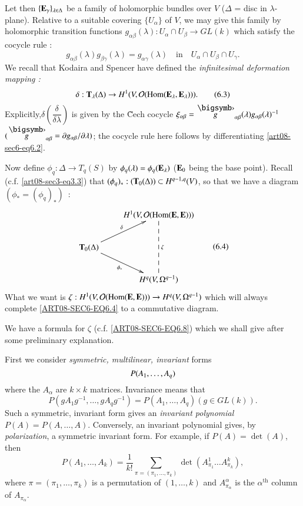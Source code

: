 Let then $\{\mathbf{E}_{\gamma}\}_{\lambda\in\Delta}$ be a family of holomorphic bundles over $V$ ($\Delta$ = disc in $\lambda$-plane). Relative to a suitable covering $\{U_{\alpha}\}$ of $V$, we may give this family by holomorphic transition functions $g_{\alpha\beta}(\lambda):U_{\alpha}\cap U_{\beta}\to GL(k)$ which satisfy the cocycle rule :
\begin{equation*}
g_{\alpha\beta}(\lambda)g_{\beta\gamma}(\lambda)=g_{\alpha\gamma}(\lambda)\text{~~ in~~ } U_{\alpha}\cap U_{\beta}\cap U_{\gamma}.\tag{6.2}\label{art08-sec6-eq6.2}
\end{equation*}
We recall that Kodaira and Spencer \cite{art08-key15} have defined the {\em infinitesimal deformation mapping :}
\begin{equation*}
\delta : \mathbf{T}_{\lambda}(\Delta)\to H^{1}(V,\mathcal{O}(\operatorname{\mathrm{Hom}}(\mathbf{E}_{\lambda},\mathbf{E}_{\lambda}))).\tag{6.3}\label{art08-sec6-eq6.3}
\end{equation*}
Explicitly,\pageoriginale $\delta\left(\dfrac{\delta}{\delta\lambda}\right)$ is given by the \~Cech cocycle $\xi_{\alpha\beta}=\overdot{g}_{\alpha\beta}(\lambda)g_{\alpha\beta}(\lambda)^{-1}$ $(\overdot{g}_{\alpha\beta}=\partial g_{\alpha\beta}/\partial\lambda)$; the cocycle rule here follows by differentiating \eqref{art08-sec6-eq6.2}. 

Now define $\phi_{q}:\Delta\to T_{q}(S)$ by $\phi_{q}(\lambda)=\phi_{q}(\mathbf{E}_{\lambda})$ ($\mathbf{E}_{0}$ being the base point). Recall (c.f. \eqref{art08-sec3-eq3.3}) that $(\phi_{q})_{*}:(\mathbf{T}_{0}(\Delta))\subset H^{q-1,q}(V)$, so that we have a diagram $(\phi_{*}=(\phi_{q})_{*})$~:
\begin{equation*}
\vcenter{\xymatrix{
 & H^{1}(V,\mathcal{O}(\Hom(\bfE,\bfE)))\ar@{--}[dd]^{\zeta}\\
\bfT_{0}(\Delta)\ar[ur]^-{\delta}\ar[dr]_-{\phi_{*}} & \\
 & H^{q}(V,\Omega^{q-1})
}}\tag{6.4}\label{ART08-SEC6-EQ6.4}
\end{equation*}
What we want is $\zeta:H^{1}(V,\mathcal{O}(\operatorname{\mathrm{Hom}}(\mathbf{E},\mathbf{E})))\to H^{q}(V,\Omega^{q-1})$ which will always complete \eqref{ART08-SEC6-EQ6.4} to a commutative diagram.

We have a formula for $\zeta$ (c.f. \eqref{ART08-SEC6-EQ6.8}) which we shall give after some preliminary explanation.

First we consider {\em symmetric, multilinear, invariant} forms 
$$
P(A_{1},\ldots,\break A_{q})
$$ 
where the $A_{\alpha}$ are $k\times k$ matrices. Invariance means that 
$$
P(gA_{1}g^{-1},\ldots,gA_{q}g^{-1})=P(A_{1},\ldots,A_{q}) (g\in GL(k)).
$$ 
Such a symmetric, invariant form gives an {\em invariant polynomial} $P(A)=P(A,\ldots,A)$. Conversely, an invariant polynomial gives, by {\em polarization}, a symmetric invariant form. For example, if $P(A)=\det(A)$, then
\begin{equation*}
P(A_{1},\ldots,A_{k})=\dfrac{1}{k!}\sum\limits_{\pi=(\pi_{1},\ldots,\pi_{k})}\det (A^{1}_{\pi_{1}}\ldots A^{k}_{\pi_{k}}),\tag{6.5}\label{art08-sec6-eq6.5}
\end{equation*}
where $\pi=(\pi_{1},\ldots,\pi_{k})$ is a permutation of $(1,\ldots,k)$ and $A^{\alpha}_{\pi_{\alpha}}$ is the $\alpha^{\text{th}}$ column of $A_{\pi_{\alpha}}$.

